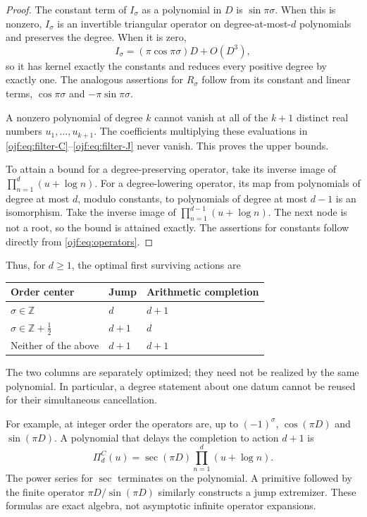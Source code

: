 \begin{proof}
The constant term of $I_\sigma$ as a polynomial in $D$ is
$\sin\pi\sigma$. When this is nonzero, $I_\sigma$ is an invertible
triangular operator on degree-at-most-$d$ polynomials and preserves the
degree. When it is zero,
\[
 I_\sigma=(\pi\cos\pi\sigma)D+O(D^3),
\]
so it has kernel exactly the constants and reduces every positive degree
by exactly one. The analogous assertions for $R_\sigma$ follow from
its constant and linear terms, $\cos\pi\sigma$ and
$-\pi\sin\pi\sigma$.

A nonzero polynomial of degree $k$ cannot vanish at all of the $k+1$
distinct real numbers $u_1,\ldots,u_{k+1}$. The coefficients multiplying
these evaluations in \eqref{ojf:eq:filter-C}--\eqref{ojf:eq:filter-J}
never vanish. This proves the upper bounds.

To attain a bound for a degree-preserving operator, take its inverse
image of $\prod_{n=1}^d(u+\log n)$. For a degree-lowering operator,
its map from polynomials of degree at most $d$, modulo constants, to
polynomials of degree at most $d-1$ is an isomorphism. Take the inverse
image of $\prod_{n=1}^{d-1}(u+\log n)$. The next node is not a root,
so the bound is attained exactly. The assertions for constants follow
directly from \eqref{ojf:eq:operators}.
\end{proof}

Thus, for $d\ge1$, the optimal first surviving actions are
\begin{center}
\begin{tabular}{@{}lll@{}}\toprule
Order center & Jump & Arithmetic completion\\\midrule
$\sigma\in\mathbb Z$ & $d$ & $d+1$\\
$\sigma\in\mathbb Z+\tfrac12$ & $d+1$ & $d$\\
Neither of the above & $d+1$ & $d+1$\\\bottomrule
\end{tabular}
\end{center}
The two columns are separately optimized; they need not be realized by
the same polynomial. In particular, a degree statement about one datum
cannot be reused for their simultaneous cancellation.

For example, at integer order the operators are, up to $(-1)^\sigma$,
$\cos(\pi D)$ and $\sin(\pi D)$. A polynomial that delays the completion
to action $d+1$ is
\begin{equation}\label{ojf:eq:cos-extremizer}
 \Pi^{C}_d(u)=\sec(\pi D)\prod_{n=1}^d(u+\log n).
\end{equation}
The power series for $\sec$ terminates on the polynomial. A primitive
followed by the finite operator $\pi D/\sin(\pi D)$ similarly constructs
a jump extremizer. These formulas are exact algebra, not asymptotic
infinite operator expansions.

